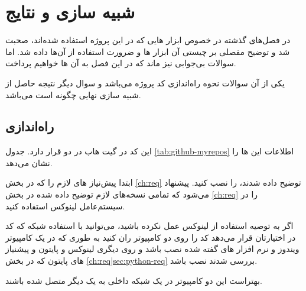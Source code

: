 \chapter{شبیه سازی و نتایج}\label{ch:resault}
در فصل‌های گذشته در خصوص ابزار هایی که در این پروژه استفاده شده‌اند، صحبت شد و توضیح مفصلی بر چیستی آن ابزار ها و ضرورت استفاده از آن‌ها داده شد. اما سوالات بی‌جوابی نیز ماند که در این فصل به آن ها خواهیم پرداخت.

یکی از آن سوالات نحوه راه‌اندازی کد پروژه می‌باشد و سوال دیگر نتیجه حاصل از شبیه سازی نهایی چگونه است می‌باشد.
\section{راه‌اندازی}\label{ch:resault|sec:launch}
این کد در گیت هاب در دو 
قرار دارد.
جدول 
\ref{tab:github-myrepos}
اطلاعات این ها
 را نشان می‌دهد.
 
\begin{table}
\caption{اطلاعات های پروژه در گیت‌هاب}
\label{tab:github-myrepos}
\end{table}

 ابتدا پیش‌نیاز های لازم را که در بخش
\ref{ch:req}
توضیح داده شدند، را نصب کنید. پیشنهاد می‌شود که تمامی نسخه‌های لازم توضیح داده شده در بخش \ref{ch:req} را در سیستم‌عامل لینوکس استفاده کنید. 

اگر به توصیه استفاده از لینوکس عمل نکرده باشید، می‌توانید با استفاده شبکه که کد در اختیارتان قرار می‌دهد کد را روی دو کامپیوتر ران کنید به طوری که در یک کامپیوتر ویندوز و نرم افزار های گفته شده نصب باشد و روی دیگری لینوکس و پایتون و پیشنیاز های پایتون که در بخش 
\ref{ch:req|sec:python-req}
بررسی شدند نصب باشد. 
\begin{note}
بهتراست این دو کامپیوتر در یک شبکه داخلی به یک دیگر متصل شده باشند.
\end{note}


